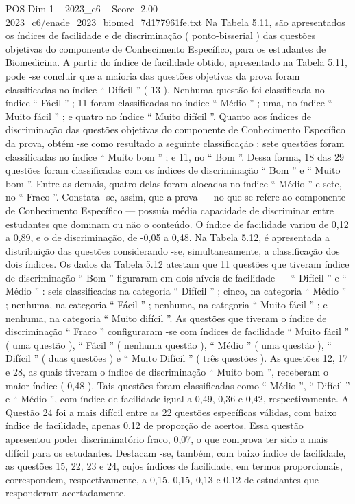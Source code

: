 \begin{textsample}{POS Dim 1 – 2023\_c6 – Score -2.00 – 2023\_c6/enade\_2023\_biomed\_7d177961fe.txt}
Na Tabela 5.11, são apresentados os índices de facilidade e de discriminação ( ponto-bisserial ) das questões objetivas do componente de Conhecimento Específico, para os estudantes de Biomedicina.
A partir do índice de facilidade obtido, apresentado na Tabela 5.11, pode -se concluir que a maioria das questões objetivas da prova foram classificadas no índice “ Difícil ” ( 13 ).
Nenhuma questão foi classificada no índice “ Fácil ” ; 11 foram classificadas no índice “ Médio ” ; uma, no índice “ Muito fácil ” ; e quatro no índice “ Muito difícil ”.
Quanto aos índices de discriminação das questões objetivas do componente de Conhecimento Específico da prova, obtém -se como resultado a seguinte classificação : sete questões foram classificadas no índice “ Muito bom ” ; e 11, no “ Bom ”.
Dessa forma, 18 das 29 questões foram classificadas com os índices de discriminação “ Bom ” e “ Muito bom ”.
Entre as demais, quatro delas foram alocadas no índice “ Médio ” e sete, no “ Fraco ”.
Constata -se, assim, que a prova — no que se refere ao componente de Conhecimento Específico — possuía média capacidade de discriminar entre estudantes que dominam ou não o conteúdo.
O índice de facilidade variou de 0,12 a 0,89, e o de discriminação, de -0,05 a 0,48.
Na Tabela 5.12, é apresentada a distribuição das questões considerando -se, simultaneamente, a classificação dos dois índices.
Os dados da Tabela 5.12 atestam que 11 questões que tiveram índice de discriminação “ Bom ” figuraram em dois níveis de facilidade — “ Difícil ” e “ Médio ” : seis classificadas na categoria “ Difícil ” ; cinco, na categoria “ Médio ” ; nenhuma, na categoria “ Fácil ” ; nenhuma, na categoria “ Muito fácil ” ; e nenhuma, na categoria “ Muito difícil ”.
As questões que tiveram o índice de discriminação “ Fraco ” configuraram -se com índices de facilidade “ Muito fácil ” ( uma questão ), “ Fácil ” ( nenhuma questão ), “ Médio ” ( uma questão ), “ Difícil ” ( duas questões ) e “ Muito Difícil ” ( três questões ).
As questões 12, 17 e 28, as quais tiveram o índice de discriminação “ Muito bom ”, receberam o maior índice ( 0,48 ).
Tais questões foram classificadas como “ Médio ”, “ Difícil ” e “ Médio ”, com índice de facilidade igual a 0,49, 0,36 e 0,42, respectivamente.
A Questão 24 foi a mais difícil entre as 22 questões específicas válidas, com baixo índice de facilidade, apenas 0,12 de proporção de acertos.
Essa questão apresentou poder discriminatório fraco, 0,07, o que comprova ter sido a mais difícil para os estudantes.
Destacam -se, também, com baixo índice de facilidade, as questões 15, 22, 23 e 24, cujos índices de facilidade, em termos proporcionais, correspondem, respectivamente, a 0,15, 0,15, 0,13 e 0,12 de estudantes que responderam acertadamente.

\end{textsample}
